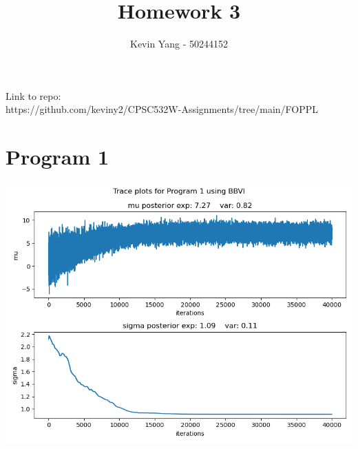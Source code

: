 \documentclass[10pt]{homeworg}
\title{Homework 3}
\author{Kevin Yang - 50244152}
\begin{document}
\maketitle

\Huge{Link to repo:}\\
\Large{https://github.com/keviny2/CPSC532W-Assignments/tree/main/FOPPL}


\section{Program 1}
\begin{center}
\includegraphics[scale=0.5]{figures/BBVI_program_1.png}
\end{center}
\end{document}
